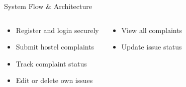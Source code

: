 \documentclass[aspectratio=169]{beamer}
\begin{document}
\begin{frame}{System Flow \& Architecture}{}
\begin{columns}[T]
    \vspace{0.2cm}
    \begin{tcolorbox}[infobox,
        title={\color{white}\small\bfseries\faUserGraduate\ Student Actions},
        colbacktitle=TealLight]
      \begin{itemize}\setlength\itemsep{0.18em}
        \item Register and login securely
        \item Submit hostel complaints
        \item Track complaint status
        \item Edit or delete own issues
      \end{itemize}
    \end{tcolorbox}
    \vspace{0.2cm}
    \begin{tcolorbox}[infobox,
        title={\color{white}\small\bfseries\faUserShield\ Admin / Warden Actions},
        colbacktitle=NavyBlue]
      \begin{itemize}\setlength\itemsep{0.18em}
        \item View all complaints
        \item Update issue status
       
      \end{itemize}
    \end{tcolorbox}
  \end{columns}
\end{frame}
\end{document}
